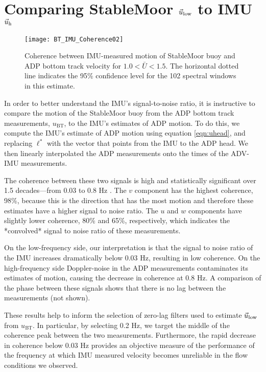 \section{Comparing StableMoor $\vec{u}_\mathrm{low}$ to IMU $\vec{u}_\mathrm{h}$}
\label{apdx:ulow}

\def\ubt{\ensuremath{u_\mathrm{BT}}}

\begin{figure}[t]
  \centering
  \texttt{[image: BT\_IMU\_Coherence02]}
  \caption{Coherence between IMU-measured motion of StableMoor buoy and ADP bottom track velocity for $1.0<\bar{U}<1.5$. The horizontal dotted line indicates the 95\% confidence level for the 102 spectral windows in this estimate.}
  \label{fig:SM_coh}
\end{figure}

In order to better understand the IMU's signal-to-noise ratio, it is instructive to compare the motion of the StableMoor buoy from the ADP bottom track measurements, $\ubt$, to the IMU's estimates of ADP motion. To do this, we compute the IMU's estimate of ADP motion using equation \eqref{eqn:uhead}, and replacing $\ell^{*}$ with the vector that points from the IMU to the ADP head. We then linearly interpolated the ADP measurements onto the times of the ADV-IMU measurements.

The coherence between these two signals is high and statistically significant over 1.5 decades---from 0.03 to 0.8 Hz \cite[][]{Priestley1981}. The $v$ component has the highest coherence, 98\%, because this is the direction that has the most motion and therefore these estimates have a higher signal to noise ratio.  The $u$ and $w$ components have slightly lower coherence, 80\% and 65\%, respectively, which indicates the *convolved* signal to noise ratio of these measurements.

On the low-frequency side, our interpretation is that the signal to noise ratio of the IMU increases dramatically below 0.03 Hz, resulting in low coherence. On the high-frequency side Doppler-noise in the ADP measurements contaminates its estimates of motion, causing the decrease in coherence at 0.8 Hz. A comparison of the phase between these signals shows that there is no lag between the measurements (not shown).

These results help to inform the selection of zero-lag filters used to estimate $\vec{u}_\mathrm{low}$ from $\ubt$. In particular, by selecting 0.2 Hz, we target the middle of the coherence peak between the two measurements. Furthermore, the rapid decrease in coherence below 0.03 Hz provides an objective measure of the performance of the frequency at which IMU measured velocity becomes unreliable in the flow conditions we observed. 



